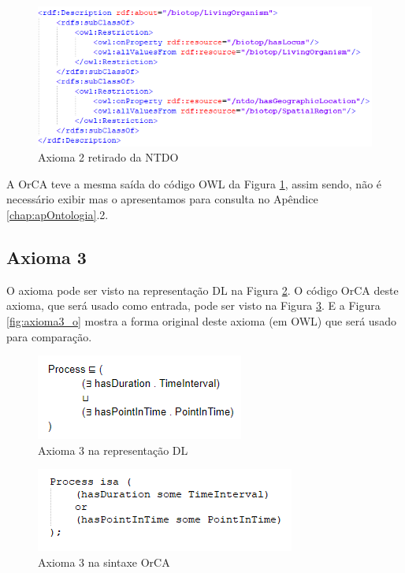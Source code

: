 \documentclass{bcc}
\begin{document}
\begin{figure}[H]
\centering
\includegraphics[width=.8\textwidth]{Figuras/axioma2_o.png}
\caption{Axioma 2 retirado da NTDO} 
\label{fig:axioma2_o}
\end{figure}

A OrCA teve a mesma saída do código OWL da Figura \ref{fig:axioma2_o}, assim sendo, não é necessário exibir mas o apresentamos para consulta no Apêndice \ref{chap:apOntologia}.2.

\subsection{Axioma 3}
O axioma pode ser visto na representação DL na Figura \ref{fig:axioma3_dl}. O código OrCA deste axioma, que será usado como entrada, pode ser visto na Figura \ref{fig:axioma3_orca}. E a Figura \ref{fig:axioma3_o} mostra a forma original deste axioma (em OWL) que será usado para comparação. 

\begin{figure}[H]
\centering
\includegraphics[width=.5\textwidth]{Figuras/axioma3_dl.png}
\caption{Axioma 3 na representação DL} 
\label{fig:axioma3_dl}
\end{figure}

\begin{figure}[H]
\centering
\includegraphics[width=.7\textwidth]{Figuras/axioma3_orca.png}
\caption{Axioma 3 na sintaxe OrCA} 
\label{fig:axioma3_orca}
\end{figure}
\end{document}
